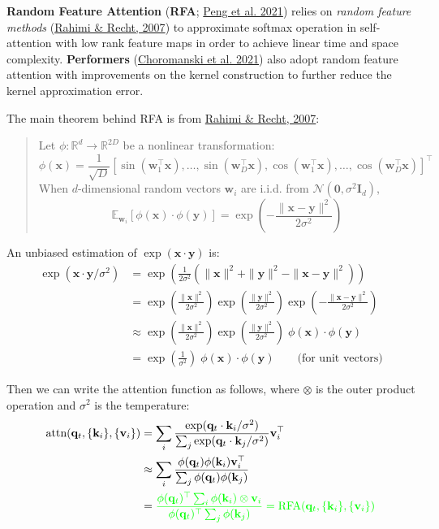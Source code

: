 \documentclass[12pt]{article}
\begin{document}
\textbf{Random Feature Attention} (\textbf{RFA}; \href{https://arxiv.org/abs/2103.02143}{Peng et al. 2021}) relies on \emph{random feature methods} (\href{https://people.eecs.berkeley.edu/~brecht/papers/07.rah.rec.nips.pdf}{Rahimi \& Recht, 2007}) to approximate softmax operation in self-attention with low rank feature maps in order to achieve linear time and space complexity. \textbf{Performers} (\href{https://arxiv.org/abs/2009.14794}{Choromanski et al. 2021}) also adopt random feature attention with improvements on the kernel construction to further reduce the kernel approximation error.

The main theorem behind RFA is from \href{https://people.eecs.berkeley.edu/~brecht/papers/07.rah.rec.nips.pdf}{Rahimi \& Recht, 2007}:
\begin{quote}
Let $\phi: \mathbb{R}^d \to \mathbb{R}^{2D}$ be a nonlinear transformation:
\[
\phi(\mathbf{x}) = \frac{1}{\sqrt{D}}[\sin(\mathbf{w}_1^\top \mathbf{x}), \dots, \sin(\mathbf{w}_D^\top \mathbf{x}), \cos(\mathbf{w}_1^\top \mathbf{x}), \dots, \cos(\mathbf{w}_D^\top \mathbf{x})]^\top
\]
When $d$-dimensional random vectors $\mathbf{w}_i$ are i.i.d. from $\mathcal{N}(\mathbf{0}, \sigma^2\mathbf{I}_d)$,
\[
\mathbb{E}_{\mathbf{w}_i} [\phi(\mathbf{x}) \cdot \phi(\mathbf{y})] = \exp\left(-\frac{\| \mathbf{x} - \mathbf{y} \|^2}{2\sigma^2}\right)
\]
\end{quote}

An unbiased estimation of $\exp(\mathbf{x} \cdot \mathbf{y})$ is:
\[
\begin{aligned}
\exp(\mathbf{x} \cdot \mathbf{y} / \sigma^2) 
&= \exp\left(\frac{1}{2\sigma^2}(\|\mathbf{x}\|^2 + \|\mathbf{y}\|^2 - \|\mathbf{x} - \mathbf{y}\|^2)\right) \\
&= \exp\left(\frac{\|\mathbf{x}\|^2}{2\sigma^2}\right) \exp\left(\frac{\|\mathbf{y}\|^2}{2\sigma^2}\right) \exp\left(- \frac{\|\mathbf{x} - \mathbf{y}\|^2}{2\sigma^2}\right) \\
&\approx \exp\left(\frac{\|\mathbf{x}\|^2}{2\sigma^2}\right) \exp\left(\frac{\|\mathbf{y}\|^2}{2\sigma^2}\right)\;\phi(\mathbf{x})\cdot\phi(\mathbf{y}) \\
&= \exp\left(\frac{1}{\sigma^2}\right)\;\phi(\mathbf{x})\cdot\phi(\mathbf{y}) \qquad \text{(for unit vectors)}
\end{aligned}
\]

Then we can write the attention function as follows, where $\otimes$ is the outer product operation and $\sigma^2$ is the temperature:
\[
\begin{aligned}
\text{attn}(\mathbf{q}_t, \{\mathbf{k}_i\}, \{\mathbf{v}_i\}) 
&= \sum_i \frac{\exp(\mathbf{q}_t\cdot\mathbf{k}_i/\sigma^2)}{\sum_j \exp(\mathbf{q}_t\cdot\mathbf{k}_j/\sigma^2)}\mathbf{v}_i^\top \\
&\approx \sum_i \frac{\phi(\mathbf{q}_t)\phi(\mathbf{k}_i)\mathbf{v}_i^\top}{\sum_j \phi(\mathbf{q}_t)\phi(\mathbf{k}_j)} \\
&= \color{green}{\frac{\phi(\mathbf{q}_t)^\top \sum_i \phi(\mathbf{k}_i)\otimes\mathbf{v}_i}{\phi(\mathbf{q}_t)^\top \sum_j \phi(\mathbf{k}_j)}
= \text{RFA}(\mathbf{q}_t, \{\mathbf{k}_i\}, \{\mathbf{v}_i\})}
\end{aligned}
\]
\end{document}
